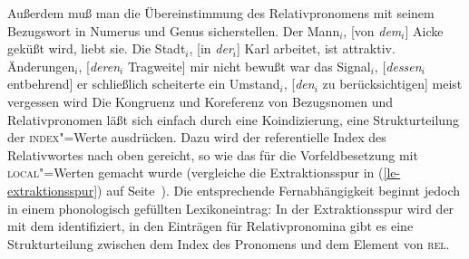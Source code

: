 Außerdem muß man die Übereinstimmung des Relativpronomens mit seinem Bezugswort in Numerus und Genus sicherstellen.
\eal
\ex Der Mann$_i$, [von \emph{dem}$_i$] Aicke geküßt wird, liebt sie.
\ex Die Stadt$_i$, [in \emph{der}$_i$] Karl arbeitet, ist attraktiv.
\ex Änderungen$_i$, [\emph{deren}$_i$ Tragweite] mir nicht bewußt war
\ex das Signal$_i$, [\emph{dessen}$_i$ entbehrend] er schließlich scheiterte
\ex ein Umstand$_i$, [\emph{den}$_i$ zu berücksichtigen] meist vergessen wird
\zl
Die Kongruenz und Koreferenz von Bezugsnomen und Relativpronomen läßt sich einfach durch eine Koindizierung, 
eine Strukturteilung der \textsc{index}"=Werte ausdrücken. Dazu wird der referentielle Index
des Relativwortes nach oben gereicht, so wie das für die Vorfeldbesetzung mit
\textsc{local}"=Werten gemacht wurde (vergleiche die Extraktionsspur in (\ref{le-extraktionsspur}) auf Seite~\pageref{le-extraktionsspur}).
Die entsprechende Fernabhängigkeit beginnt jedoch in einem phonologisch gefüllten Lexikoneintrag:
\ea{}
\z
In der Extraktionsspur wird der \localw mit dem \slashel identifiziert,
in den Einträgen für Relativpronomina gibt es eine Strukturteilung zwischen dem Index des Pronomens
und dem Element von \textsc{rel}.

